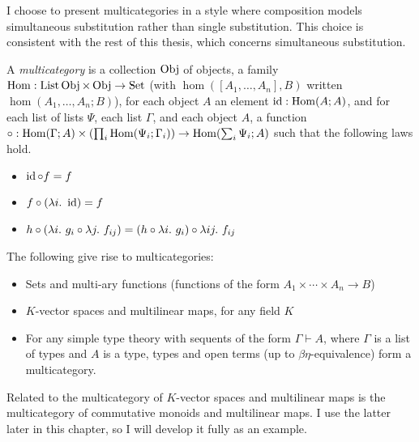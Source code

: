 I choose to present multicategories in a style where composition models
simultaneous substitution rather than single substitution.
This choice is consistent with the rest of this thesis, which concerns
simultaneous substitution.

\begin{definition}
  A \emph{multicategory} is a collection $\operatorname{Obj}$ of objects, a family
  $\operatorname{Hom} : \operatorname{List} \operatorname{Obj} \times \operatorname{Obj} \to \operatorname{Set}$ (with $\hom([A_1, \ldots, A_n], B)$
  written $\hom(A_1, \ldots, A_n; B)$), for each object $A$ an element
  $\operatorname{id} : \operatorname{Hom}(A; A)$, and for each list of lists $\Psi$, each list $\Gamma$, and
  each object $A$, a function
  ${\circ} : \hom(\Gamma; A) \times \plr{\prod_i \hom(\Psi_i; \Gamma_i)} \to
  \hom\plr{\sum_i \Psi_i; A}$ such that the following laws hold.
  \begin{itemize}
    \item $\operatorname{id} \circ f = f$
    \item $f \circ \plr{\lambda i.~\id} = f$
    \item $h \circ \plr{\lambda i.~g_i \circ \lambda j.~f_{ij}} =
      (h \circ \lambda i.~g_i) \circ \lambda ij.~f_{ij}$
  \end{itemize}
\end{definition}

\begin{example}
  The following give rise to multicategories:
  \begin{itemize}
    \item Sets and multi-ary functions (functions of the form
      $A_1 \times \cdots \times A_n \to B$)
    \item $K$-vector spaces and multilinear maps, for any field $K$
    \item For any simple type theory with sequents of the form
      $\Gamma \vdash A$, where $\Gamma$ is a list of types and $A$ is a type,
      types and open terms (up to $\beta\eta$-equivalence) form a multicategory.
  \end{itemize}
\end{example}

Related to the multicategory of $K$-vector spaces and multilinear maps is the
multicategory of commutative monoids and multilinear maps.
I use the latter later in this chapter, so I will
develop it fully as an example.

